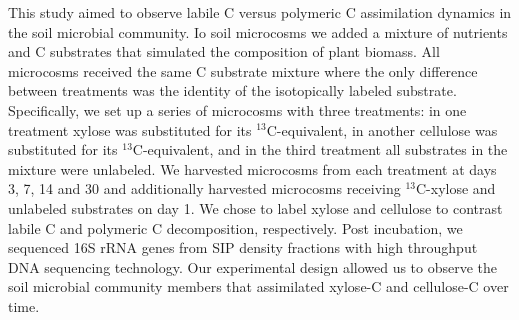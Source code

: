 This study aimed to observe labile C versus polymeric C assimilation dynamics
in the soil microbial community. Io soil microcosms we added a mixture of
nutrients and C substrates that simulated the composition of plant biomass. All
microcosms received the same C substrate mixture where the only difference
between treatments was the identity of the isotopically labeled substrate.
Specifically, we set up a series of microcosms with three treatments: in one
treatment xylose was substituted for its $^{13}$C-equivalent, in another
cellulose was substituted for its $^{13}$C-equivalent, and in the third
treatment all substrates in the mixture were unlabeled. We harvested microcosms
from each treatment at days 3, 7, 14 and 30 and additionally harvested
microcosms receiving $^{13}$C-xylose and unlabeled substrates on day 1. We
chose to label xylose and cellulose to contrast labile C and polymeric
C decomposition, respectively. Post incubation, we sequenced 16S rRNA genes
from SIP density fractions with high throughput DNA sequencing technology. Our
experimental design allowed us to observe the soil microbial community members
that assimilated xylose-C and cellulose-C over time.
